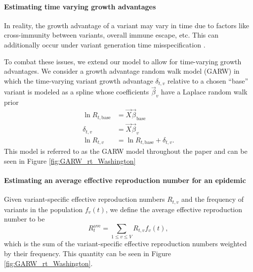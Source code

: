 \paragraph{Estimating time varying growth advantages}
In reality, the growth advantage of a variant may vary in time due to factors like cross-immunity between variants, overall immune escape, etc.
This can additionally occur under variant generation time misspecification \cite{Park2021.05.03.21256545}.

To combat these issues, we extend our model to allow for time-varying growth advantages.
We consider a growth advantage random walk model (GARW) in which the time-varying variant growth advantage $\delta_{t,v}$ relative to a chosen ``base'' variant is modeled as a spline whose coefficients $\vec{\beta}_{v}$ have a Laplace random walk prior
\begin{align*}
  \ln R_{t, \text{base}} &= \vec{X} \vec{\beta}_{\text{base}}\\
  \delta_{t, v} &= \vec{X} \vec{\beta}_{v}\\
  \ln R_{t, v} &= \ln R_{t, \text{base}} + \delta_{t, v}.
\end{align*}
This model is referred to as the GARW model throughout the paper and can be seen in Figure \ref{fig:GARW_rt_Washington}

\paragraph{Estimating an average effective reproduction number for an epidemic}

Given variant-specific effective reproduction numbers $R_{t,v}$ and the frequency of variants in the population $f_{v}(t)$, we define the average effective reproduction number to be
\begin{equation}
  R_{t}^{\text{ave}} = \sum_{1\leq v \leq V} R_{t,v}f_{v}(t),
\end{equation}
which is the sum of the variant-specific effective reproduction numbers weighted by their frequency. This quantity can be seen in Figure \ref{fig:GARW_rt_Washington}.

%
%

